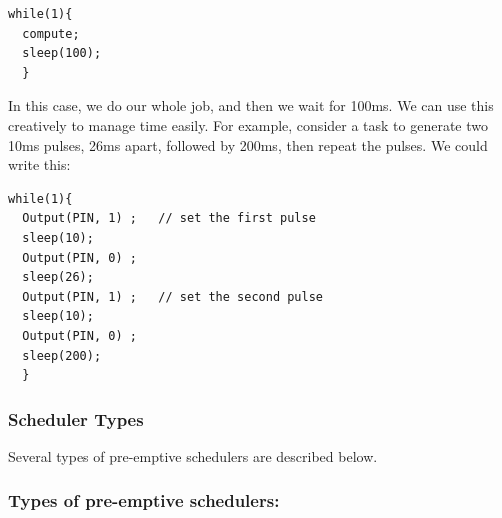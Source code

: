 \begin{verbatim}
while(1){
  compute;
  sleep(100);
  }
\end{verbatim}
In this case, we do our whole job, and then we wait for 100ms.   We can use this creatively to manage time easily. For example, consider a task to generate two 10ms pulses, 26ms apart, followed by 200ms, then repeat the pulses.   We could write this:

\begin{verbatim}
while(1){
  Output(PIN, 1) ;   // set the first pulse
  sleep(10);
  Output(PIN, 0) ; 
  sleep(26);
  Output(PIN, 1) ;   // set the second pulse
  sleep(10);
  Output(PIN, 0) ; 
  sleep(200);
  }
\end{verbatim}


\subsubsection*{Scheduler Types}
Several types of pre-emptive schedulers are described below.


\subsubsection*{Types of pre-emptive schedulers:}

